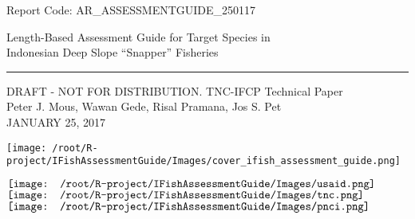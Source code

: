 \begin{titlepage}
\begin{flushleft}
	\textsf{Report Code: AR\_ASSESSMENTGUIDE\_250117}
\end{flushleft}

\vspace*{2cm}
\begin{flushright}
        {\Large\textsf{Length-Based Assessment Guide for Target Species in \\
        Indonesian Deep Slope ``Snapper'' Fisheries}}\\[0.2cm]
        \rule{\linewidth}{0.5mm}
        \textsf{DRAFT - NOT FOR DISTRIBUTION. TNC-IFCP Technical Paper}\\[2cm]
        \textsf{Peter J. Mous, Wawan Gede, Risal Pramana, Jos S. Pet\\[1cm]
        JANUARY 25, 2017}
\end{flushright}

\begin{center}
\texttt{[image: /root/R-project/IFishAssessmentGuide/Images/cover\_ifish\_assessment\_guide.png]}
\end{center}

\vfill

\noindent
\begin{minipage}[b]{\linewidth}
\noindent
\centering
$\vcenter{\hbox{\texttt{[image: /root/R-project/IFishAssessmentGuide/Images/usaid.png]}}}$
\hfill
$\vcenter{\hbox{\texttt{[image: /root/R-project/IFishAssessmentGuide/Images/tnc.png]}}}$
\hfill
$\vcenter{\hbox{\texttt{[image: /root/R-project/IFishAssessmentGuide/Images/pnci.png]}}}$
\end{minipage}
\end{titlepage}